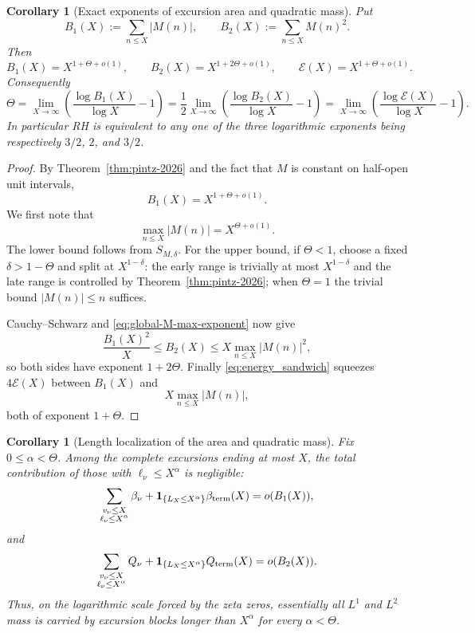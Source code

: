 \documentclass[11pt]{amsart}
\numberwithin{equation}{section}
\theoremstyle{plain}
\newtheorem{corollary}[theorem]{Corollary}
\theoremstyle{definition}
\theoremstyle{remark}
\newcommand{\En}{\mathcal{E}}
\begin{document}
\begin{corollary}[Exact exponents of excursion area and quadratic mass]
\label{cor:pintz-excursion-exponents}
Put
\[
 B_1(X):=\sum_{n\le X}|M(n)|,
 \qquad
 B_2(X):=\sum_{n\le X}M(n)^2.
\]
Then
\begin{equation}
\label{eq:pintz-B1-B2}
 B_1(X)=X^{1+\Theta+o(1)},
 \qquad
 B_2(X)=X^{1+2\Theta+o(1)},
 \qquad
 \En(X)=X^{1+\Theta+o(1)}.
\end{equation}
Consequently
\begin{equation}
\label{eq:Theta-from-excursions}
 \Theta=\lim_{X\to\infty}\left(\frac{\log B_1(X)}{\log X}-1\right)
 =\frac12\lim_{X\to\infty}
 \left(\frac{\log B_2(X)}{\log X}-1\right)
 =\lim_{X\to\infty}\left(\frac{\log\En(X)}{\log X}-1\right).
\end{equation}
In particular RH is equivalent to any one of the three logarithmic exponents
being respectively $3/2$, $2$, and $3/2$.
\end{corollary}

\begin{proof}
By Theorem~\ref{thm:pintz-2026} and the fact that $M$ is constant on
half-open unit intervals,
\[
 B_1(X)=X^{1+\Theta+o(1)}.
\]
We first note that
\begin{equation}
\label{eq:global-M-max-exponent}
 \max_{n\le X}|M(n)|=X^{\Theta+o(1)}.
\end{equation}
The lower bound follows from $S_{M,\delta}$.  For the upper bound, if
$\Theta<1$, choose a fixed $\delta>1-\Theta$ and split at
$X^{1-\delta}$: the early range is trivially at most $X^{1-\delta}$ and the
late range is controlled by Theorem~\ref{thm:pintz-2026}; when $\Theta=1$
the trivial bound $|M(n)|\le n$ suffices.

Cauchy--Schwarz and \eqref{eq:global-M-max-exponent} now give
\[
 \frac{B_1(X)^2}{X}\le B_2(X)
 \le X\max_{n\le X}|M(n)|^2,
\]
so both sides have exponent $1+2\Theta$.  Finally
\eqref{eq:energy_sandwich} squeezes $4\En(X)$ between $B_1(X)$ and
\[
 X\max_{n\le X}|M(n)|,
\]
both of exponent $1+\Theta$.
\end{proof}

\begin{corollary}[Length localization of the area and quadratic mass]
\label{cor:pintz-length-localization}
Fix $0\le\alpha<\Theta$.  Among the complete excursions ending at most $X$,
the total contribution of those with $\ell_\nu\le X^\alpha$ is negligible:
\[
 \sum_{\substack{v_\nu\le X\\ \ell_\nu\le X^\alpha}}\beta_\nu
 +\mathbf 1_{\{L_X\le X^\alpha\}}\beta_{\rm term}(X)
 =o(B_1(X)),
\]
and
\[
 \sum_{\substack{v_\nu\le X\\ \ell_\nu\le X^\alpha}}Q_\nu
 +\mathbf 1_{\{L_X\le X^\alpha\}}Q_{\rm term}(X)
 =o(B_2(X)).
\]
Thus, on the logarithmic scale forced by the zeta zeros, essentially all
$L^1$ and $L^2$ mass is carried by excursion blocks longer than
$X^\alpha$ for every $\alpha<\Theta$.
\end{corollary}
\end{document}
